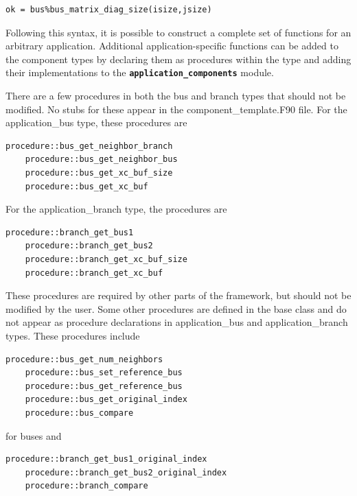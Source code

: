 \documentclass[12pt]{report} %
\begin{document}
{
\color{red}
\begin{Verbatim}[fontseries=b]
      ok = bus%bus_matrix_diag_size(isize,jsize)
\end{Verbatim}
}

Following this syntax, it is possible to construct a complete set of functions for an arbitrary application. Additional application-specific functions can be added to the component types by declaring them as procedures within the type and adding their implementations to the \texttt{\textbf{application\_components}} module.

There are a few procedures in both the bus and branch types that should not be modified. No stubs for these appear in the component\_template.F90 file. For the application\_bus type, these procedures are

{
\color{red}
\begin{Verbatim}[fontseries=b]
    procedure::bus_get_neighbor_branch
    procedure::bus_get_neighbor_bus
    procedure::bus_get_xc_buf_size
    procedure::bus_get_xc_buf
\end{Verbatim}
}

For the application\_branch type, the procedures are

{
\color{red}
\begin{Verbatim}[fontseries=b]
    procedure::branch_get_bus1
    procedure::branch_get_bus2
    procedure::branch_get_xc_buf_size
    procedure::branch_get_xc_buf
\end{Verbatim}
}

These procedures are required by other parts of the framework, but should not be modified by the user. Some other procedures are defined in the base class and do not appear as procedure declarations in application\_bus and application\_branch types. These procedures include

{
\color{red}
\begin{Verbatim}[fontseries=b]
    procedure::bus_get_num_neighbors
    procedure::bus_set_reference_bus
    procedure::bus_get_reference_bus
    procedure::bus_get_original_index
    procedure::bus_compare
\end{Verbatim}
}

for buses and

{
\color{red}
\begin{Verbatim}[fontseries=b]
    procedure::branch_get_bus1_original_index
    procedure::branch_get_bus2_original_index
    procedure::branch_compare
\end{Verbatim}
}
\end{document}
